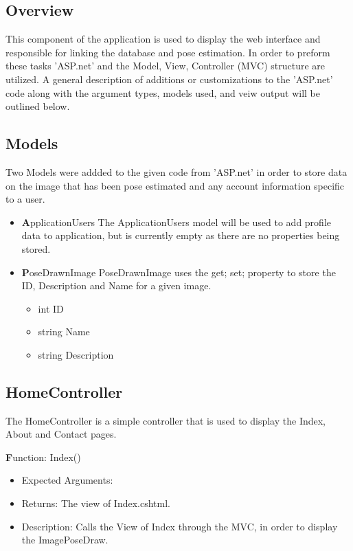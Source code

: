 \documentclass{scrreprt}
\begin{document}
\subsection{Overview}
This component of the application is used to display the web interface and responsible for linking the database and pose estimation. In order to preform these tasks 'ASP.net' and the Model, View, Controller (MVC) structure are utilized. A general description of additions or customizations to the 'ASP.net' code along with the argument types, models used, and veiw output will be outlined below.

\subsection{Models}
Two Models were addded to the given code from 'ASP.net' in order to store data on the image that has been pose estimated and any account information specific to a user.

    \begin{itemize}
      \item \textbf  ApplicationUsers
      The ApplicationUsers model will be used to add profile data to application, but is currently empty as there are no properties being stored.

      \item \textbf  PoseDrawnImage
      PoseDrawnImage uses the {get; set;} property to store the ID, Description and Name for a given image.
      \begin{itemize}
        \item int ID
        \item string Name
        \item string Description
      \end{itemize}

    \end{itemize}

\subsection{HomeController}
The HomeController is a simple controller that is used to display the Index, About and Contact pages. 

  \textbf Function: Index()
  \begin{itemize}
    \item Expected Arguments:

    \item Returns:
    The view of Index.cshtml.
    \item Description:
    Calls the View of Index through the MVC, in order to display the ImagePoseDraw.
  \end{itemize}
\end{document}
